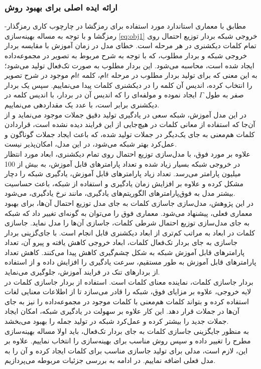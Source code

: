 \subsubsection{ارائه ایده اصلی برای بهبود روش}
مطابق با معماری استاندارد مورد استفاده برای رمزگشا در چارچوب کاری رمزگذار-رمزگشا و با توجه به مساله بهینه‌سازی \eqref{eq:obj1} خروجی شبکه بردار توزیع احتمال روی تمام کلمات دیکشنری در هر مرحله است. خطای مدل در زمان آموزش با مقایسه بردار خروجی شبکه و بردار مطلوب، که با توجه به شرح مربوط به تصویر در مجموعه‌داده ایجاد شده است، محاسبه می‌شود. این بردار مطلوب به صورت تک‌فعال تولید می‌شود؛ به این معنی که برای تولید بردار مطلوب در مرحله $t$ام، کلمه $t$ام موجود در شرح تصویر را انتخاب کرده، اندیس آن کلمه را در دیکشنری کلمات پیدا می‌نماییم. سپس یک بردار صفر به طول $\Gamma$ ایجاد نموده و مولفه‌ای را که اندیس آن در بردار، با اندیس کلمه در دیکشنری برابر است، با عدد یک مقداردهی می‌نماییم.
\\
در این مدل آموزش، شبکه سعی در یادگیری تولید دقیق جملات موجود می‌نماید و از آن‌جا که استفاده از معانی کلمات در هیچ‌جایی از این فرایند دیده نشده است، قراردادن کلمات هم‌معنی به جای یک‌دیگر در جملات تولید شده، که باعث ایجاد جملات گوناگون و عمل‌کرد بهتر شبکه می‌شود، در این مدل، امکان‌پذیر نیست.
\\
علاوه بر مورد فوق، با مدل‌سازی توزیع احتمال روی تمام دیکشنری، ابعاد مورد انتظار در خروجی شبکه بسیار زیاد شده و تعداد پارامترهای قابل آموزش، به بیش از 100 میلیون پارامتر می‌رسد. تعداد زیاد پارامترهای قابل آموزش، یادگیری شبکه را دچار مشکل کرده و علاوه بر افزایش زمان یادگیری و استفاده از شبکه، باعث حساسیت بیشتر مدل به فوق‌پارامترهای الگوریتم‌های یادگیری، مانند نرخ یادگیری،‌ می‌شود.
\\
در این پژوهش، مدل‌سازی جاسازی کلمات به جای مدل توزیع احتمال آن‌ها، برای بهبود معماری فعلی، پیشنهاد می‌شود. معماری فوق را می‌توان به گونه‌ای تغییر داد که شبکه به جای مدل‌سازی توزیع احتمال شرطی کلمات،‌ جاسازی آن‌ها را مدل نماید. جاسازی کلمات در ابعاد به مراتب کم‌تری از ابعاد دیکشنری قابل انجام است. با جای‌گزینی بردار جاسازی به جای بردار تک‌فعال کلمات، ابعاد خروجی کاهش یافته و پیرو آن، تعداد پارامترهای قابل آموزش شبکه به شکل چشم‌گیری کاهش پیدا می‌کنند. کاهش تعداد پارامترهای قابل آموزش به طور مستقیم، سرعت یادگیری را افزایش داده و از استفاده از بردارهای تنک در فرایند آموزش،‌ جلوگیری می‌نماید.
\\
بردار جاسازی کلمات، نماینده معنای کلمات است. استفاده از بردار جاسازی کلمات در لایه خروجی، علاوه بر مزایای فوق، شبکه را قادر می‌سازد تا از اطلاعات معنایی لغات استفاده کرده و بتواند کلمات هم‌معنی با کلمات موجود در مجموعه‌داده را نیز به جای آن‌ها در جملات قرار دهد. این کار علاوه بر سهولت در یادگیری شبکه، امکان ایجاد جملات جدید را بیشتر کرده و عمل‌کرد شبکه در تولید جمله را بهبود می‌بخشد.
\\
به منظور جایگزینی جاسازی کلمات به جای بردار تک‌فعال، باید اولا مساله بهینه‌سازی مطرح را تغییر داده و سپس روش مناسب برای بهینه‌سازی را انتخاب نماییم. علاوه بر این، لازم است، مدلی برای تولید جاسازی مناسب برای کلمات ایجاد کرده و آن را به مدل فعلی اضافه نماییم. در ادامه به بررسی جزئیات مربوطه می‌پردازیم.
